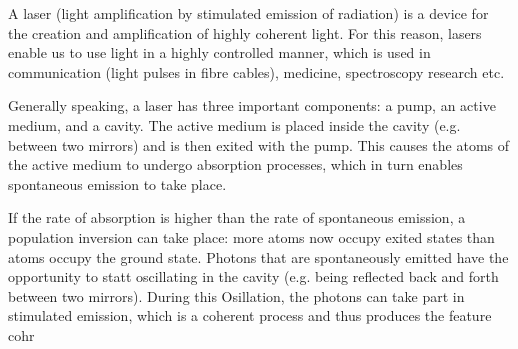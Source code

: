 \documentclass[../main.tex]{subfiles}
\begin{document}
    A laser (light amplification by stimulated emission of radiation) is a device for the creation and amplification of highly coherent light. For this reason, lasers enable us to use light in a highly controlled manner, which is used in communication (light pulses in fibre cables), medicine, spectroscopy research etc. 

    \noindent Generally speaking, a laser has three important components: a pump, an active medium, and a cavity. The active medium is placed inside the cavity (e.g. between two mirrors) and is then exited with the pump. This causes the atoms of the active medium to undergo absorption processes, which in turn enables spontaneous emission to take place.

    If the rate of absorption is higher than the rate of spontaneous emission, a population inversion can take place: more atoms now occupy exited states than atoms occupy the ground state. Photons that are spontaneously emitted have the opportunity to statt oscillating in the cavity (e.g. being reflected back and forth between two mirrors). During this Osillation, the photons can take part in stimulated emission, which is a coherent process and thus produces the feature cohr
\end{document}
